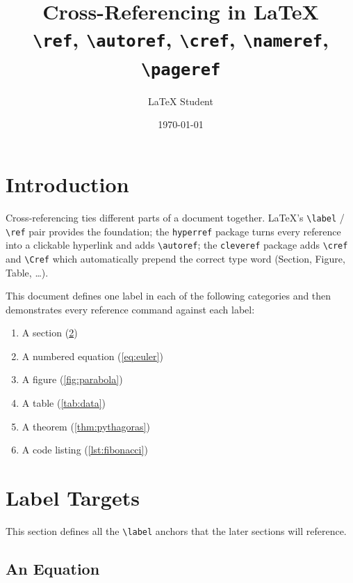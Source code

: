 \documentclass[12pt,a4paper]{article}
\title{\textbf{Cross-Referencing in \LaTeX}\\[0.4em]
       \large \texttt{\textbackslash ref}, \texttt{\textbackslash autoref},
       \texttt{\textbackslash cref}, \texttt{\textbackslash nameref},
       \texttt{\textbackslash pageref}}
\author{LaTeX Student}
\date{\today}
\begin{document}
\maketitle
\tableofcontents
\newpage


\section{Introduction}
\label{sec:intro}

Cross-referencing ties different parts of a document together.  \LaTeX's
\verb|\label| / \verb|\ref| pair provides the foundation; the
\texttt{hyperref} package turns every reference into a clickable hyperlink
and adds \verb|\autoref|; the \texttt{cleveref} package adds \verb|\cref|
and \verb|\Cref| which automatically prepend the correct type word (Section,
Figure, Table, \ldots).

\medskip
\noindent This document defines one label in each of the following
categories and then demonstrates every reference command against each label:
\begin{enumerate}
    \item A section (\cref{sec:targets})
    \item A numbered equation (\cref{eq:euler})
    \item A figure (\cref{fig:parabola})
    \item A table (\cref{tab:data})
    \item A theorem (\cref{thm:pythagoras})
    \item A code listing (\cref{lst:fibonacci})
\end{enumerate}


\section{Label Targets}
\label{sec:targets}

This section defines all the \verb|\label| anchors that the later sections
will reference.

\subsection{An Equation}
\label{subsec:eq}
\end{document}
